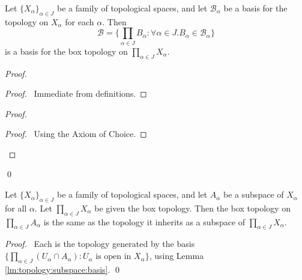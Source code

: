\begin{thm}[AC]
  Let $\{X_\alpha\}_{\alpha \in J}$ be a family of topological spaces, and
  let $\mathcal{B}_\alpha$ be a basis for the topology on $X_\alpha$ for each
  $\alpha$. Then
  \[ \mathcal{B} = \{ \prod_{\alpha \in J} B_\alpha : \forall \alpha \in J.
  B_\alpha \in \mathcal{B}_\alpha \} \]
  is a basis for the box topology on $\prod_{\alpha \in J} X_\alpha$.
\end{thm}

\begin{proof}
  \pf
  \begin{proof}
    \pf\ Immediate from definitions.
  \end{proof}
  \begin{proof}
    \begin{proof}
      \pf\ Using the Axiom of Choice.
    \end{proof}
  \end{proof}
  \qed
\end{proof}

\begin{thm}
  Let $\{X_\alpha\}_{\alpha \in J}$ be a family of topological spaces, and
  let $A_\alpha$ be a subspace of $X_\alpha$ for all $\alpha$. Let
  $\prod_{\alpha \in J} X_\alpha$ be given the box topology. Then the box
  topology on $\prod_{\alpha \in J} A_\alpha$ is the same as the topology it
  inherits as a subspace of $\prod_{\alpha \in J} X_\alpha$.
\end{thm}

\begin{proof}
  \pf\ Each is the topology generated by the basis \\$\{ \prod_{\alpha \in J}
  (U_\alpha \cap A_\alpha) : U_\alpha \text{ is open in } X_\alpha \}$, using
  Lemma \ref{lm:topology:subspace:basis}. \qed
\end{proof}


